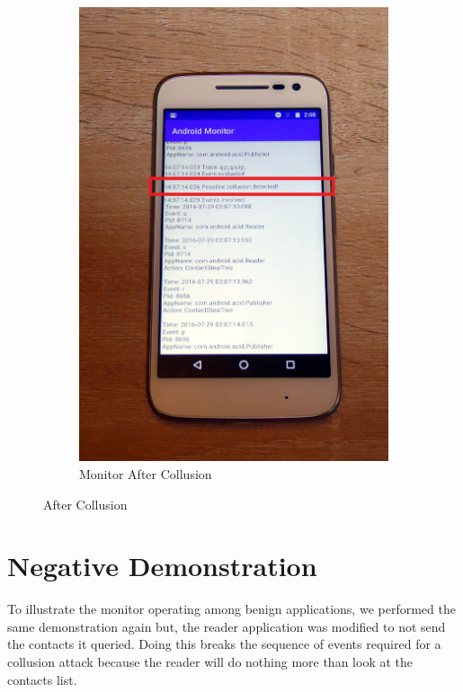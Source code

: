 \begin{figure}
\begin{subfigure}{0.3\textheight}
		\includegraphics[height=0.45\textheight]{graphics/PhonePhotos/09 - MonitorAfter.jpg}
		\caption{Monitor After Collusion}
		\label{fig:MonitorAfter}
	\end{subfigure}

	\caption{After Collusion}
	\label{fig:AfterCollusion}
\end{figure}

\section{Negative Demonstration}

To illustrate the monitor operating among benign applications, we performed the same demonstration again but, the reader application was modified to not send the contacts it queried.  Doing this breaks the sequence of events required for a collusion attack because the reader will do nothing more than look at the contacts list.

